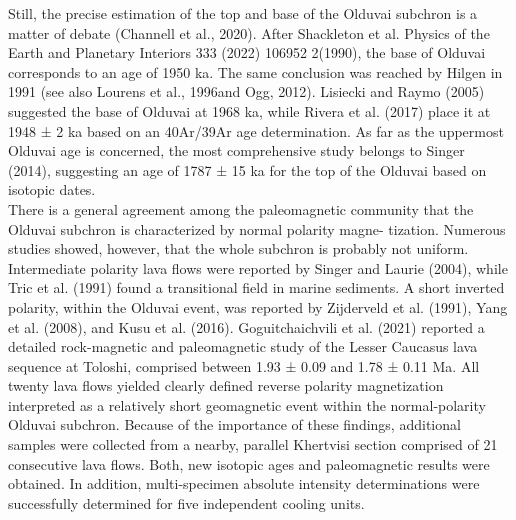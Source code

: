 \documentclass[review]{elsarticle}
\begin{document}
Still, the precise estimation of the top and base of the Olduvai subchron is a matter of debate (Channell et al., 2020). After Shackleton et al. Physics of the Earth and Planetary Interiors 333 (2022) 106952
2(1990), the base of Olduvai corresponds to an age of 1950 ka. The same conclusion was reached by Hilgen in 1991 (see also Lourens et al., 1996and Ogg, 2012). Lisiecki and Raymo (2005) suggested the base of Olduvai at 1968 ka, while Rivera et al. (2017) place it at 1948 ± 2 ka based on an 40Ar/39Ar age determination. As far as the uppermost Olduvai age is concerned, the most comprehensive study belongs to Singer (2014), suggesting an age of 1787 ± 15 ka for the top of the Olduvai based on isotopic dates.
\\
There is a general agreement among the paleomagnetic community
that the Olduvai subchron is characterized by normal polarity magne-
tization. Numerous studies showed, however, that the whole subchron is
probably not uniform. Intermediate polarity lava flows were reported by
Singer and Laurie (2004), while Tric et al. (1991) found a transitional
field in marine sediments. A short inverted polarity, within the Olduvai
event, was reported by Zijderveld et al. (1991), Yang et al. (2008), and
Kusu et al. (2016). Goguitchaichvili et al. (2021) reported a detailed
rock-magnetic and paleomagnetic study of the Lesser Caucasus lava
sequence at Toloshi, comprised between 1.93 ± 0.09 and 1.78 ± 0.11
Ma. All twenty lava flows yielded clearly defined reverse polarity
magnetization interpreted as a relatively short geomagnetic event
within the normal-polarity Olduvai subchron. Because of the importance
of these findings, additional samples were collected from a nearby,
parallel Khertvisi section comprised of 21 consecutive lava flows. Both,
new isotopic ages and paleomagnetic results were obtained. In addition,
multi-specimen absolute intensity determinations were successfully
determined for five independent cooling units.
\end{document}
